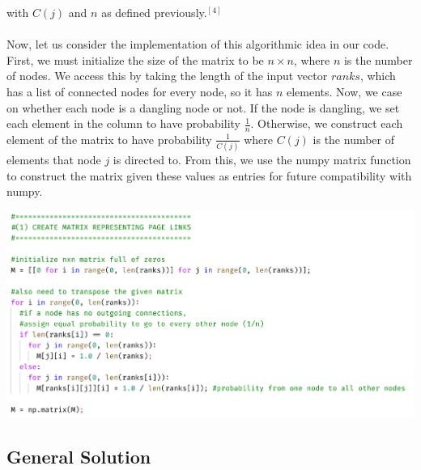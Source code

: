\documentclass{article}
\begin{document}
    with $C(j)$ and $n$ as defined previously.$^{[4]}$
    \\\\
    \noindent
    Now, let us consider the implementation of this algorithmic idea in our code. First, we must initialize the size of the matrix to be $n \times n$, where $n$ is the number of nodes. We access this by taking the length of the input vector $ranks$, which has a list of connected nodes for every node, so it has $n$ elements. Now, we case on whether each node is a dangling node or not. If the node is dangling, we set each element in the column to have probability $\frac{1}{n}$. Otherwise, we construct each element of the matrix to have probability $\frac{1}{C(j)}$ where $C(j)$ is the number of elements that node $j$ is directed to. From this, we use the numpy matrix function to construct the matrix given these values as entries for future compatibility with numpy.
    
    \begin{center}
        \includegraphics[scale=.6]{snip1}
    \end{center}
    
    
    \subsection{General Solution}
   
\end{document}
